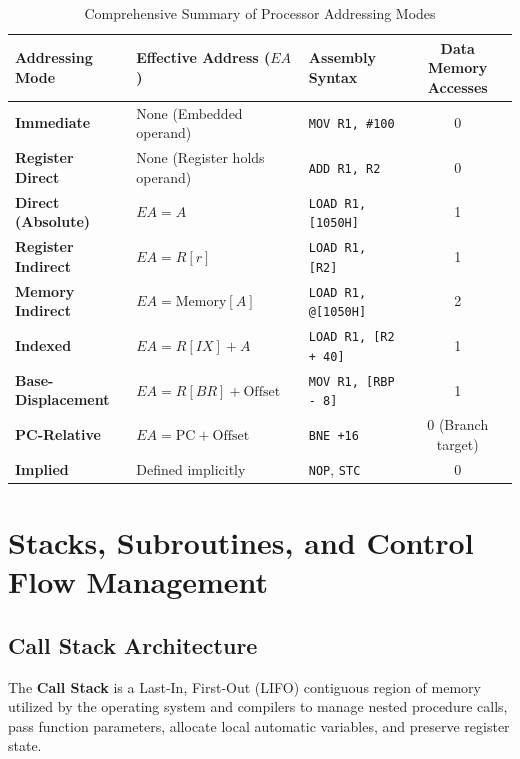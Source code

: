\begin{table}[htbp]
\centering
\small
\caption{Comprehensive Summary of Processor Addressing Modes}
\label{tab:addressing_modes}
\begin{tabularx}{\textwidth}{l X X c}
\toprule
\textbf{Addressing Mode} & \textbf{Effective Address ($EA$)} & \textbf{Assembly Syntax} & \textbf{Data Memory Accesses} \\
\midrule
\textbf{Immediate} & None (Embedded operand) & \texttt{MOV R1, \#100} & 0 \\
\textbf{Register Direct} & None (Register holds operand) & \texttt{ADD R1, R2} & 0 \\
\textbf{Direct (Absolute)} & $EA = A$ & \texttt{LOAD R1, [1050H]} & 1 \\
\textbf{Register Indirect} & $EA = R[r]$ & \texttt{LOAD R1, [R2]} & 1 \\
\textbf{Memory Indirect} & $EA = \text{Memory}[A]$ & \texttt{LOAD R1, @[1050H]} & 2 \\
\textbf{Indexed} & $EA = R[IX] + A$ & \texttt{LOAD R1, [R2 + 40]} & 1 \\
\textbf{Base-Displacement} & $EA = R[BR] + \text{Offset}$ & \texttt{MOV R1, [RBP - 8]} & 1 \\
\textbf{PC-Relative} & $EA = \text{PC} + \text{Offset}$ & \texttt{BNE +16} & 0 (Branch target) \\
\textbf{Implied} & Defined implicitly & \texttt{NOP}, \texttt{STC} & 0 \\
\bottomrule
\end{tabularx}
\end{table}


\section{Stacks, Subroutines, and Control Flow Management}
\label{sec:stack_subroutines}

\subsection{Call Stack Architecture}
The \textbf{Call Stack} is a Last-In, First-Out (LIFO) contiguous region of memory utilized by the operating system and compilers to manage nested procedure calls, pass function parameters, allocate local automatic variables, and preserve register state.

